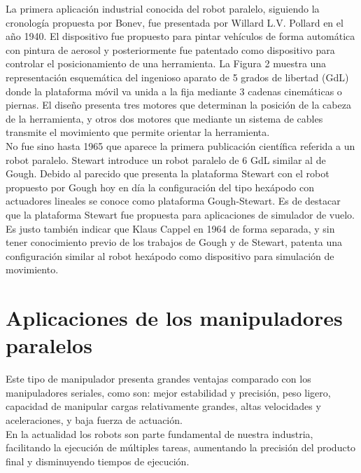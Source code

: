 \documentclass[11pt,a4paper,oldfontcommands,oneside]{memoir}
\begin{document}
La primera aplicación industrial conocida del robot paralelo, siguiendo la cronología propuesta por Bonev, fue presentada por Willard L.V. Pollard en el año 1940. El dispositivo fue propuesto para pintar vehículos de forma automática con pintura de aerosol y posteriormente fue patentado como dispositivo para controlar el posicionamiento de una herramienta. La Figura 2 muestra una representación esquemática del ingenioso aparato de 5 grados de libertad (GdL) donde la plataforma móvil va unida a la fija mediante 3 cadenas cinemáticas o piernas. El diseño presenta tres motores que determinan la posición de la cabeza de la herramienta, y otros dos motores que mediante un sistema de cables transmite el movimiento que permite orientar la herramienta.\\

No fue sino hasta 1965 que aparece la primera publicación científica referida a un robot paralelo. Stewart introduce un robot paralelo de 6 GdL similar al de Gough. Debido al parecido que presenta la plataforma Stewart con el robot propuesto por Gough hoy en día la configuración del tipo hexápodo con actuadores lineales se conoce como plataforma Gough-Stewart. Es de destacar que la plataforma Stewart fue propuesta para aplicaciones de simulador de vuelo. Es justo también indicar que Klaus Cappel en 1964 de forma separada, y sin tener conocimiento previo de los trabajos de Gough y de Stewart, patenta una configuración similar al robot hexápodo como dispositivo para simulación de movimiento.\\



\chapter{Aplicaciones de los manipuladores paralelos} 

Este tipo de manipulador presenta grandes ventajas comparado con los manipuladores seriales, como son: mejor estabilidad y precisión, peso ligero, capacidad de manipular cargas relativamente grandes, altas velocidades y aceleraciones, y baja fuerza de actuación.\\

En la actualidad los robots son parte fundamental de nuestra industria, facilitando la ejecución de múltiples tareas, aumentando la precisión del producto final y disminuyendo tiempos de ejecución.\\
\end{document}

